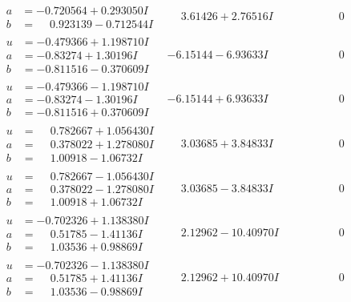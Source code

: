 \documentclass[1p]{elsarticle_modified}
\theoremstyle{definition}
\begin{document}
$$\begin{array}{c|c|c}
\begin{aligned}
a &= -0.720564 + 0.293050 I \\
b &= \phantom{-}0.923139 - 0.712544 I\end{aligned}
 & \phantom{-}3.61426 + 2.76516 I & \phantom{-0.000000 } 0 \\ \hline\begin{aligned}
u &= -0.479366 + 1.198710 I \\
a &= -0.83274 + 1.30196 I \\
b &= -0.811516 - 0.370609 I\end{aligned}
 & -6.15144 - 6.93633 I & \phantom{-0.000000 } 0 \\ \hline\begin{aligned}
u &= -0.479366 - 1.198710 I \\
a &= -0.83274 - 1.30196 I \\
b &= -0.811516 + 0.370609 I\end{aligned}
 & -6.15144 + 6.93633 I & \phantom{-0.000000 } 0 \\ \hline\begin{aligned}
u &= \phantom{-}0.782667 + 1.056430 I \\
a &= \phantom{-}0.378022 + 1.278080 I \\
b &= \phantom{-}1.00918 - 1.06732 I\end{aligned}
 & \phantom{-}3.03685 + 3.84833 I & \phantom{-0.000000 } 0 \\ \hline\begin{aligned}
u &= \phantom{-}0.782667 - 1.056430 I \\
a &= \phantom{-}0.378022 - 1.278080 I \\
b &= \phantom{-}1.00918 + 1.06732 I\end{aligned}
 & \phantom{-}3.03685 - 3.84833 I & \phantom{-0.000000 } 0 \\ \hline\begin{aligned}
u &= -0.702326 + 1.138380 I \\
a &= \phantom{-}0.51785 - 1.41136 I \\
b &= \phantom{-}1.03536 + 0.98869 I\end{aligned}
 & \phantom{-}2.12962 - 10.40970 I & \phantom{-0.000000 } 0 \\ \hline\begin{aligned}
u &= -0.702326 - 1.138380 I \\
a &= \phantom{-}0.51785 + 1.41136 I \\
b &= \phantom{-}1.03536 - 0.98869 I\end{aligned}
 & \phantom{-}2.12962 + 10.40970 I & \phantom{-0.000000 } 0\\

\end{array}$$
\end{document}
